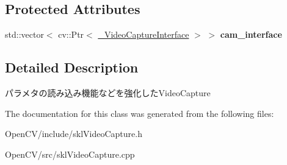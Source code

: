 \subsection*{Protected Attributes}
\begin{DoxyCompactItemize}
\item 
\hypertarget{classskl_1_1_video_capture_a6b399c2cd88317a93d306e6db3b5c47e}{}\label{classskl_1_1_video_capture_a6b399c2cd88317a93d306e6db3b5c47e} 
std\+::vector$<$ cv\+::\+Ptr$<$ \hyperlink{classskl_1_1___video_capture_interface}{\+\_\+\+Video\+Capture\+Interface} $>$ $>$ {\bfseries cam\+\_\+interface}
\end{DoxyCompactItemize}


\subsection{Detailed Description}
パラメタの読み込み機能などを強化した\+Video\+Capture 

The documentation for this class was generated from the following files\+:\begin{DoxyCompactItemize}
\item 
Open\+C\+V/include/skl\+Video\+Capture.\+h\item 
Open\+C\+V/src/skl\+Video\+Capture.\+cpp\end{DoxyCompactItemize}
